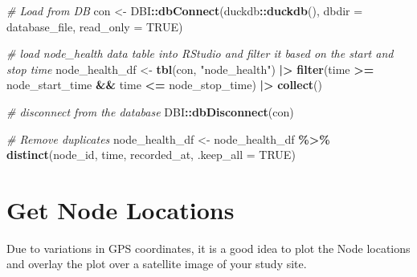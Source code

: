 \documentclass[
]{book}
\newenvironment{Shaded}{\begin{snugshade}}{\end{snugshade}}
\newcommand{\AttributeTok}[1]{\textcolor[rgb]{0.13,0.29,0.53}{#1}}
\newcommand{\CommentTok}[1]{\textcolor[rgb]{0.56,0.35,0.01}{\textit{#1}}}
\newcommand{\ConstantTok}[1]{\textcolor[rgb]{0.56,0.35,0.01}{#1}}
\newcommand{\FunctionTok}[1]{\textcolor[rgb]{0.13,0.29,0.53}{\textbf{#1}}}
\newcommand{\NormalTok}[1]{#1}
\newcommand{\OtherTok}[1]{\textcolor[rgb]{0.56,0.35,0.01}{#1}}
\newcommand{\SpecialCharTok}[1]{\textcolor[rgb]{0.81,0.36,0.00}{\textbf{#1}}}
\newcommand{\StringTok}[1]{\textcolor[rgb]{0.31,0.60,0.02}{#1}}
\begin{document}
\begin{Shaded}
\begin{Highlighting}[]
\CommentTok{\# Load from DB}
\NormalTok{con }\OtherTok{\textless{}{-}}\NormalTok{ DBI}\SpecialCharTok{::}\FunctionTok{dbConnect}\NormalTok{(duckdb}\SpecialCharTok{::}\FunctionTok{duckdb}\NormalTok{(), }
                      \AttributeTok{dbdir =}\NormalTok{ database\_file, }
                      \AttributeTok{read\_only =} \ConstantTok{TRUE}\NormalTok{)}

\CommentTok{\# load node\_health data table into RStudio and filter it based on the start and stop time}
\NormalTok{node\_health\_df }\OtherTok{\textless{}{-}} \FunctionTok{tbl}\NormalTok{(con, }\StringTok{"node\_health"}\NormalTok{) }\SpecialCharTok{|\textgreater{}}
  \FunctionTok{filter}\NormalTok{(time }\SpecialCharTok{\textgreater{}=}\NormalTok{ node\_start\_time }\SpecialCharTok{\&\&}\NormalTok{ time }\SpecialCharTok{\textless{}=}\NormalTok{ node\_stop\_time) }\SpecialCharTok{|\textgreater{}}
  \FunctionTok{collect}\NormalTok{()}

\CommentTok{\# disconnect from the database}
\NormalTok{DBI}\SpecialCharTok{::}\FunctionTok{dbDisconnect}\NormalTok{(con)}

\CommentTok{\# Remove duplicates}
\NormalTok{node\_health\_df }\OtherTok{\textless{}{-}}\NormalTok{ node\_health\_df }\SpecialCharTok{\%\textgreater{}\%} 
  \FunctionTok{distinct}\NormalTok{(node\_id, }
\NormalTok{           time, }
\NormalTok{           recorded\_at, }
           \AttributeTok{.keep\_all =} \ConstantTok{TRUE}\NormalTok{)}
\end{Highlighting}
\end{Shaded}

\section{Get Node Locations}\label{get-node-locations-1}

Due to variations in GPS coordinates, it is a good idea to plot the Node locations and overlay the plot over a satellite image of your study site.
\end{document}
